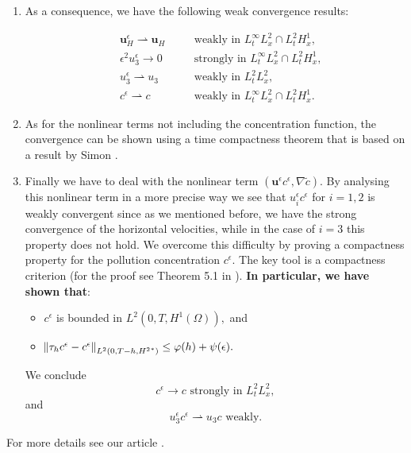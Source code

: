 \documentclass[11pt]{article}
\begin{document}
\begin{enumerate}
  \item As a consequence, we have the following weak convergence results:
  
  \begin{align} 
    &  \mathbf{u}_H^\epsilon \rightharpoonup \mathbf{u}_H &\quad & \text{weakly in $L_t^\infty L_x^2 \cap L_t^2 H_x^1$,} \label{WeakConvUHEps} \\
    &  \epsilon^2 u_3^\epsilon \to 0 &\quad & \text{strongly in $L_t^\infty L_x^2 \cap L_t^2 H_x^1$,} \label{WeakConvU3Eps} \\ 
    & u_3^\epsilon \rightharpoonup u_3  &\quad & \text{weakly in $L_t^2 L_x^2$,} \label{WeakConvU3NoEps} \\
    & c^\epsilon \rightharpoonup c &\quad & \text{weakly in $L_t^\infty L_x^2 \cap L_t^2 H_x^1.$} \label{WeakConvCEps1}
  \end{align}

  \item As for the nonlinear terms not including the concentration function, the convergence can be shown using a time compactness theorem that is based on a result by Simon \cite{simon1986compact}.
  
  \item Finally we have to deal with the nonlinear term $(\mathbf{u}^\epsilon c^\epsilon, \nabla \tilde{c}).$ By analysing this nonlinear term in a more precise way we see that $u^\epsilon_i c^\epsilon$ for $i=1,2$ is weakly convergent since as we mentioned before, we have the strong convergence of the horizontal velocities, while in the case of $i=3$ this property does not hold. We overcome this difficulty by proving a compactness property for the pollution concentration $c^\epsilon.$ The key tool is a compactness criterion (for the proof see Theorem 5.1 in \cite{azerad2001mathematical}).
  \textbf{In particular, we have shown that}:
   \begin{itemize}
      \item $c^\epsilon$ is bounded in $L^2(0,T, H^1(\Omega)),$ and
      \item $\norm{\tau_h c^\epsilon - c^\epsilon}_{L^2(0,T-h, {H^2}^*)} \leq \varphi(h) + \psi(\epsilon).$
   \end{itemize}
   We conclude $$c^\epsilon \to c \text{ strongly in } L^2_t L^2_x,$$ and $$u^\epsilon_3 c^\epsilon \rightharpoonup u_3 c \text{ weakly.}$$

\end{enumerate}

For more details see our article \cite{pollatmws2019}.
\end{document}
